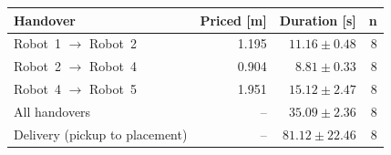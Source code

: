 \begin{tabular}{@{}lrrr@{}}
\toprule
        \textbf{Handover} & \textbf{Priced [m]} & \textbf{Duration [s]} & \textbf{n} \\
\midrule
        Robot~1 $\rightarrow$ Robot~2 & 1.195 & $11.16 \pm 0.48$ & 8 \\
        Robot~2 $\rightarrow$ Robot~4 & 0.904 & $8.81 \pm 0.33$ & 8 \\
        Robot~4 $\rightarrow$ Robot~5 & 1.951 & $15.12 \pm 2.47$ & 8 \\
\midrule
        All handovers & -- & $35.09 \pm 2.36$ & 8 \\
        Delivery (pickup to placement) & -- & $81.12 \pm 22.46$ & 8 \\
\bottomrule
\end{tabular}
